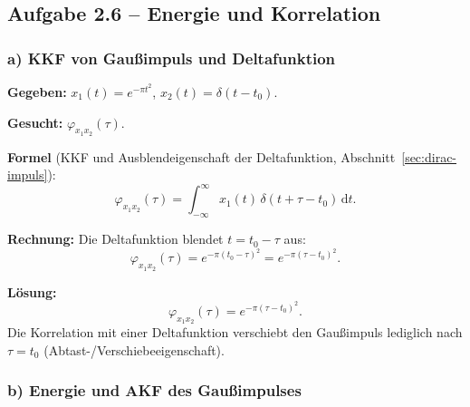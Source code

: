 \subsection*{Aufgabe 2.6 – Energie und Korrelation}

\subsubsection*{a) KKF von Gaußimpuls und Deltafunktion}

\begin{beispiel}

\textbf{Gegeben:} $x_1(t)=e^{-\pi t^2}$, $x_2(t)=\delta(t-t_0)$.

\textbf{Gesucht:} $\varphi_{x_1 x_2}(\tau)$.

\textbf{Formel} (KKF und Ausblendeigenschaft der Deltafunktion, Abschnitt~\ref{sec:dirac-impuls}):
$$
\varphi_{x_1 x_2}(\tau) = \int_{-\infty}^{\infty} x_1(t)\,\delta(t+\tau-t_0)\,\mathrm{d}t.
$$

\textbf{Rechnung:} Die Deltafunktion blendet $t=t_0-\tau$ aus:
$$
\varphi_{x_1 x_2}(\tau) = e^{-\pi(t_0-\tau)^2} = e^{-\pi(\tau-t_0)^2}.
$$

\textbf{Lösung:}
$$
\boxed{\;\varphi_{x_1 x_2}(\tau) = e^{-\pi(\tau-t_0)^2}.\;}
$$
Die Korrelation mit einer Deltafunktion verschiebt den Gaußimpuls lediglich nach
$\tau=t_0$ (Abtast-/Verschiebeeigenschaft).
\end{beispiel}

\subsubsection*{b) Energie und AKF des Gaußimpulses}

